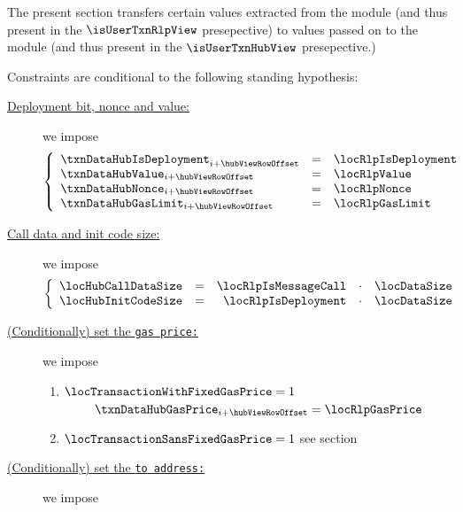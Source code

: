\begin{center}
\end{center}
The present section transfers certain values
extracted from the \rlpTxnMod{} module (and thus present in the $\isUserTxnRlpView$ presepective) to
values passed on to the \hubMod{} module (and thus present in the $\isUserTxnHubView$ presepective.)

Constraints are conditional to the following standing hypothesis:
\begin{description}
	\item[\underline{Deployment bit, nonce and value:}]
		we impose
		\[
			\left\{ \begin{array}{lcl}
				\txnDataHubIsDeployment _{i + \hubViewRowOffset} & = & \locRlpIsDeployment \\
				\txnDataHubValue        _{i + \hubViewRowOffset} & = & \locRlpValue        \\
				\txnDataHubNonce        _{i + \hubViewRowOffset} & = & \locRlpNonce        \\
				\txnDataHubGasLimit     _{i + \hubViewRowOffset} & = & \locRlpGasLimit     \\
			\end{array} \right.
		\]
	\item[\underline{Call data and init code size:}] \label{user txn data: processing: user: data transafer hub to rlp: call data size and init code size}
		we impose
		\[
			\left\{ \begin{array}{lcrcl}
				\locHubCallDataSize & = & \locRlpIsMessageCall & \cdot & \locDataSize \\
				\locHubInitCodeSize & = & \locRlpIsDeployment  & \cdot & \locDataSize \\
			\end{array} \right.
		\]
	\item[\underline{(Conditionally) set the \tt{gas price}:}]
		we impose
		\begin{enumerate}
		        \item
				\If
				$\locTransactionWithFixedGasPrice = 1$ \Then
				\[
					\txnDataHubGasPrice _{i + \hubViewRowOffset}
					=
					\locRlpGasPrice
				\]
			\item
				\If $\locTransactionSansFixedGasPrice = 1$ \Then see
				section \specTodo{}
		\end{enumerate}
	\item[\underline{(Conditionally) set the \tt{to} address:}]
		we impose

\end{description}
